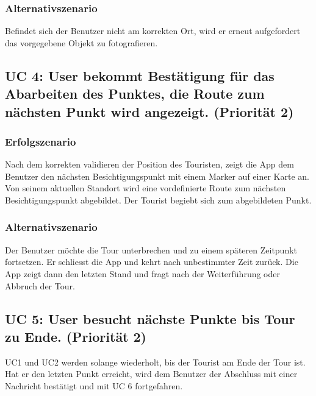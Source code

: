 \documentclass[a4paper,10pt,xetex]{article}
\begin{document}
\subsubsection{Alternativszenario}\label{alternativszenario}

Befindet sich der Benutzer nicht am korrekten Ort, wird er erneut
aufgefordert das vorgegebene Objekt zu fotografieren.

\subsection{UC 4: User bekommt Bestätigung für das Abarbeiten des
Punktes, die Route zum nächsten Punkt wird angezeigt. (Priorität
2)}\label{uc-4-user-bekommt-bestuxe4tigung-fuxfcr-das-abarbeiten-des-punktes-die-route-zum-nuxe4chsten-punkt-wird-angezeigt.-priorituxe4t-2}

\subsubsection{Erfolgszenario}\label{erfolgszenario-2}

Nach dem korrekten validieren der Position des Touristen, zeigt die App
dem Benutzer den nächsten Besichtigungspunkt mit einem Marker auf einer
Karte an. Von seinem aktuellen Standort wird eine vordefinierte Route
zum nächsten Besichtigungspunkt abgebildet. Der Tourist begiebt sich zum
abgebildeten Punkt.

\subsubsection{Alternativszenario}\label{alternativszenario-1}

Der Benutzer möchte die Tour unterbrechen und zu einem späteren
Zeitpunkt fortsetzen. Er schliesst die App und kehrt nach unbestimmter
Zeit zurück. Die App zeigt dann den letzten Stand und fragt nach der
Weiterführung oder Abbruch der Tour.

\subsection{UC 5: User besucht nächste Punkte bis Tour zu Ende.
(Priorität
2)}\label{uc-5-user-besucht-nuxe4chste-punkte-bis-tour-zu-ende.-priorituxe4t-2}

UC1 und UC2 werden solange wiederholt, bis der Tourist am Ende der Tour
ist. Hat er den letzten Punkt erreicht, wird dem Benutzer der Abschluss
mit einer Nachricht bestätigt und mit UC 6 fortgefahren.
\end{document}
